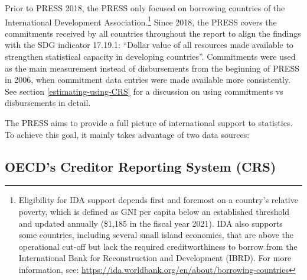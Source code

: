 \documentclass[
]{article}
\begin{document}
Prior to PRESS 2018, the PRESS only focused on borrowing countries of the International Development
Association.\footnote{Eligibility for IDA support depends first and foremost on a country's relative poverty, which is defined as GNI per capita
  below an established threshold and updated annually (\$1,185 in the fiscal year 2021). IDA also supports some countries,
  including several small island economies, that are above the operational cut‐off but lack the required creditworthiness to
  borrow from the International Bank for Reconstruction and Development (IBRD). For more information, see: \url{https://ida.worldbank.org/en/about/borrowing-countries}}
Since 2018, the PRESS covers the commitments received by all countries throughout the
report to align the findings with the SDG indicator 17.19.1: ``Dollar value of all resources made
available to strengthen statistical capacity in developing countries''. Commitments were used as the
main measurement instead of disbursements from the beginning of PRESS in 2006, when commitment
data entries were made available more consistently. See section \ref{estimating-using-CRS} for a discussion on using commitments vs disbursements in detail.

The PRESS aims to provide a full picture of international support to statistics. To achieve this goal, it
mainly takes advantage of two data sources:

\hypertarget{oecds-creditor-reporting-system-crs}{%
\subsection{OECD's Creditor Reporting System (CRS)}\label{oecds-creditor-reporting-system-crs}}
\end{document}
